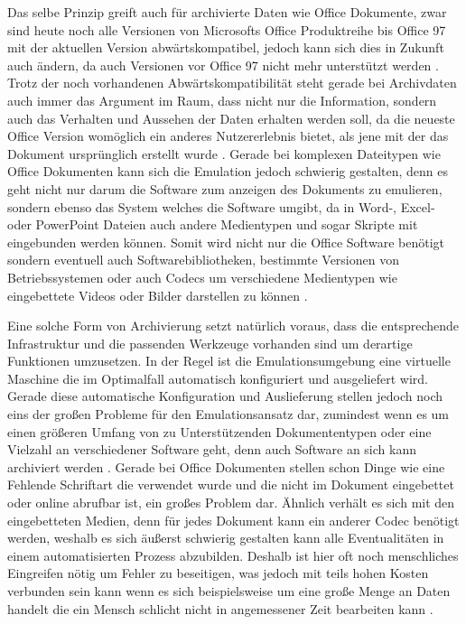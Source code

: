 \documentclass[conference,compsoc,final,a4paper]{IEEEtran}
\begin{document}
Das selbe Prinzip greift auch für archivierte Daten wie Office Dokumente, zwar sind heute noch alle Versionen von Microsofts Office Produktreihe bis Office 97 mit der aktuellen Version abwärtskompatibel, jedoch kann sich dies in Zukunft auch ändern, da auch Versionen vor Office 97 nicht mehr unterstützt werden \autocite{MSOfficeFileFormats}. Trotz der noch vorhandenen Abwärtskompatibilität steht gerade bei Archivdaten auch immer das Argument im Raum, dass nicht nur die Information, sondern auch das Verhalten und Aussehen der Daten erhalten werden soll, da die neueste Office Version womöglich ein anderes Nutzererlebnis bietet, als jene mit der das Dokument ursprünglich erstellt wurde \autocite{Lee2002}. Gerade bei komplexen Dateitypen wie Office Dokumenten kann sich die Emulation jedoch schwierig gestalten, denn es geht nicht nur darum die Software zum anzeigen des Dokuments zu emulieren, sondern ebenso das System welches die Software umgibt, da in Word-, Excel- oder PowerPoint Dateien auch andere Medientypen und sogar Skripte mit eingebunden werden können. Somit wird nicht nur die Office Software benötigt sondern eventuell auch Softwarebibliotheken, bestimmte Versionen von Betriebssystemen oder auch Codecs um verschiedene Medientypen wie eingebettete Videos oder Bilder darstellen zu können \autocite{Reichherzer2006}.

Eine solche Form von Archivierung setzt natürlich voraus, dass die entsprechende Infrastruktur und die passenden Werkzeuge vorhanden sind um derartige Funktionen umzusetzen. In der Regel ist die Emulationsumgebung eine virtuelle Maschine die im Optimalfall automatisch konfiguriert und ausgeliefert wird. Gerade diese automatische Konfiguration und Auslieferung stellen jedoch noch eins der großen Probleme für den Emulationsansatz dar, zumindest wenn es um einen größeren Umfang von zu Unterstützenden Dokumententypen oder eine Vielzahl an verschiedener Software geht, denn auch Software an sich kann archiviert werden \autocite{Reichherzer2006}. Gerade bei Office Dokumenten stellen schon Dinge wie eine Fehlende Schriftart die verwendet wurde und die nicht im Dokument eingebettet oder online abrufbar ist, ein großes Problem dar. Ähnlich verhält es sich mit den eingebetteten Medien, denn für jedes Dokument kann ein anderer Codec benötigt werden, weshalb es sich äußerst schwierig gestalten kann alle Eventualitäten in einem automatisierten Prozess abzubilden. Deshalb ist hier oft noch menschliches Eingreifen nötig um Fehler zu beseitigen, was jedoch mit teils hohen Kosten verbunden sein kann wenn es sich beispielsweise um eine große Menge an Daten handelt die ein Mensch schlicht nicht in angemessener Zeit bearbeiten kann \autocite{Reichherzer2006}.
\end{document}
